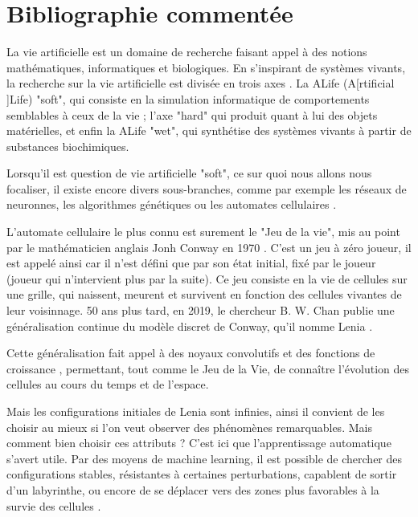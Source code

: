 \documentclass[a4paper, 11pt]{article}
\let\cite=\supercite
\begin{document}
\section*{Bibliographie comment\'ee}

La vie artificielle est un domaine de recherche faisant appel à des notions 
mathématiques, informatiques et biologiques. En s'inspirant de systèmes vivants, la
recherche sur la vie artificielle est divisée en trois axes \cite{BEDAU2003505}. La 
ALife (A[rtificial ]Life) "soft", qui consiste en la simulation informatique de
comportements semblables à ceux de la vie ; l'axe "hard" qui produit quant à lui des
objets matérielles, et enfin la ALife "wet", qui synthétise des systèmes vivants à
partir de substances biochimiques.

Lorsqu'il est question de vie artificielle "soft", ce sur quoi nous allons nous
focaliser, il existe encore divers sous-branches, comme par exemple les réseaux de
neuronnes, les algorithmes génétiques ou les automates cellulaires 
\cite{komosinski2009artificial}.

L'automate cellulaire le plus connu est surement le "Jeu de la vie", mis au point par
le mathématicien anglais Jonh Conway en 1970 \cite{izhikevich2015game}. C'est un jeu à
zéro joueur, il est appelé ainsi car il n'est défini que par son état initial, fixé par
le joueur (joueur qui n'intervient plus par la suite). Ce jeu consiste en la vie de 
cellules sur une grille, qui naissent, meurent et survivent en fonction des cellules 
vivantes de leur voisinnage.
50 ans plus tard, en 2019, le chercheur B. W. Chan publie une généralisation continue du
modèle discret de Conway, qu'il nomme Lenia \cite{Chan_2019}.

Cette généralisation fait appel à des noyaux convolutifs et des fonctions de croissance
\cite{Chan_2019}, permettant, tout comme le Jeu de la Vie, de connaître l'évolution des
cellules au cours du temps et de l'espace.

Mais les configurations initiales de Lenia sont infinies, ainsi il convient de les
choisir au mieux si l'on veut observer des phénomènes remarquables. Mais comment bien
choisir ces attributs ? C'est ici que l'apprentissage automatique s'avert utile.
Par des moyens de machine learning, il est possible de chercher des configurations
stables, résistantes à certaines perturbations, capablent de sortir d'un labyrinthe, ou
encore de se déplacer vers des zones plus favorables à la survie des cellules 
\cite{hamon:hal-03519319} \cite{plantec2023flowlenia}.
\end{document}
